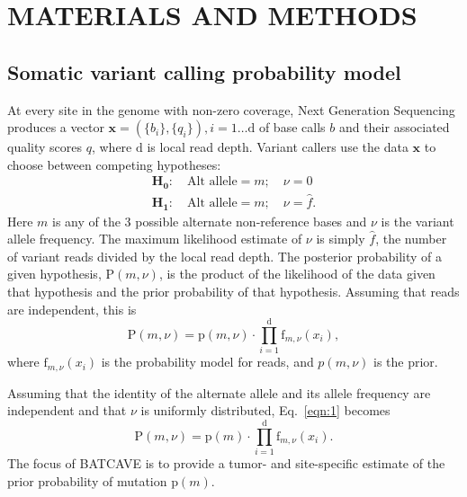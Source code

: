 \documentclass[a4,center,fleqn]{NAR}
\newcommand{\batcave}{BATCAVE\xspace}
\begin{document}
\section{MATERIALS AND METHODS}
\subsection{Somatic variant calling probability model}

At every site in the genome with non-zero coverage, Next Generation Sequencing produces a vector $\mathbf{x}  = (\{b_i\},\{q_i\}), i = 1\dots \mathrm{d}$ of base calls $b$ and their associated quality scores $q$, where $\mathrm{d}$ is local read depth.
Variant callers use the data $\mathbf{x}$ to choose between competing hypotheses:
\begin{gather}
  \label{eqn:hypothesis}
    \mathbf{H_0}:\quad \textrm{Alt allele} = m;\quad\nu = 0\\
    \mathbf{H_1}:\quad \textrm{Alt allele} = m;\quad\nu = \hat{f}.
\end{gather}
Here $m$ is any of the 3 possible alternate non-reference bases and $\nu$ is the variant allele frequency.
The maximum likelihood estimate of $\nu$ is simply $\hat{f}$, the number of variant reads divided by the local read depth.
The posterior probability of a given hypothesis, $\mathrm{P}(m,\nu)$, is the product of the likelihood of the data given that hypothesis and the prior probability of that hypothesis. 
Assuming that reads are independent, this is
\begin{equation}\label{eqn:1}
  \mathrm{P}(m,\nu) = \mathrm{p}(m,\nu) \cdot \prod_{i=1}^{\mathrm{d}} \textrm{f}_{m,\nu}(x_i),
\end{equation}
where $\textrm{f}_{m,\nu}(x_i)$ is the probability model for reads, and $p(m,\nu)$ is the prior.

Assuming that the identity of the alternate allele and its allele frequency are independent and that $\nu$ is uniformly distributed, Eq.~\ref{eqn:1} becomes
\begin{equation}  \label{eqn:2}
  \mathrm{P}(m,\nu) = \mathrm{p}(m) \cdot \prod_{i=1}^{\mathrm{d}} \textrm{f}_{m,\nu}(x_i).
\end{equation}
The focus of \batcave is to provide a tumor- and site-specific estimate of the prior probability of mutation $\mathrm{p}(m)$.
\end{document}
